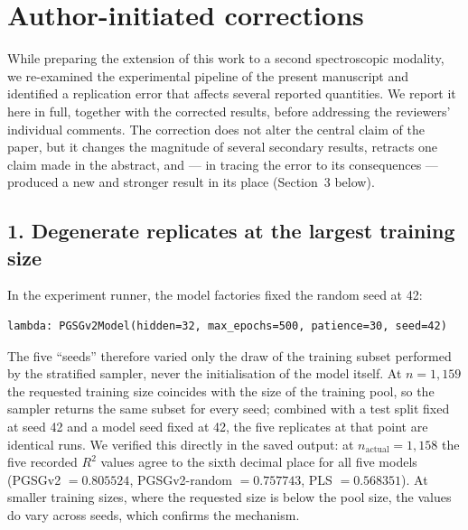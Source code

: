 
\section*{Author-initiated corrections}

While preparing the extension of this work to a second spectroscopic
modality, we re-examined the experimental pipeline of the present manuscript
and identified a replication error that affects several reported quantities.
We report it here in full, together with the corrected results, before
addressing the reviewers' individual comments. The correction does not alter
the central claim of the paper, but it changes the magnitude of several
secondary results, retracts one claim made in the abstract, and --- in
tracing the error to its consequences --- produced a new and stronger result
in its place (Section~3 below).

\subsection*{1. Degenerate replicates at the largest training size}

In the experiment runner, the model factories fixed the random seed at 42:

\begin{verbatim}
lambda: PGSGv2Model(hidden=32, max_epochs=500, patience=30, seed=42)
\end{verbatim}

The five ``seeds'' therefore varied only the draw of the training subset
performed by the stratified sampler, never the initialisation of the model
itself. At $n = 1{,}159$ the requested training size coincides with the size
of the training pool, so the sampler returns the same subset for every seed;
combined with a test split fixed at seed 42 and a model seed fixed at 42,
the five replicates at that point are identical runs. We verified this
directly in the saved output: at $n_{\text{actual}} = 1{,}158$ the five
recorded $R^2$ values agree to the sixth decimal place for all five models
(PGSGv2 $= 0.805524$, PGSGv2-random $= 0.757743$, PLS $= 0.568351$). At
smaller training sizes, where the requested size is below the pool size, the
values do vary across seeds, which confirms the mechanism.

